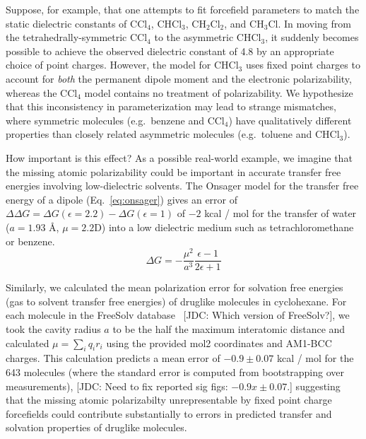 \documentclass[aps,pre,twocolumn,nofootinbib,superscriptaddress,linenumbers]{revtex4-1}
\begin{document}
Suppose, for example, that one attempts to fit forcefield parameters to match the static dielectric constants of $\mathrm{CCl_4}$, $\mathrm{CHCl_3}$, $\mathrm{CH_2Cl_2}$, and $\mathrm{CH_3Cl}$.
In moving from the tetrahedrally-symmetric $\mathrm{CCl_4}$ to the asymmetric $\mathrm{CHCl_3}$, it suddenly becomes possible to achieve the observed dielectric constant of 4.8 by an appropriate choice of point charges.
However, the model for $\mathrm{CHCl_3}$ uses fixed point charges to account for \emph{both} the permanent dipole moment and the electronic polarizability, whereas the $\mathrm{CCl_4}$ model contains no treatment of polarizability.  
We hypothesize that this inconsistency in parameterization may lead to strange mismatches, where symmetric molecules (e.g.~benzene and $\mathrm{CCl_4}$) have qualitatively different properties than closely related asymmetric molecules (e.g.~toluene and $\mathrm{CHCl_3}$).

How important is this effect?
As a possible real-world example, we imagine that the missing atomic polarizability could be important in accurate transfer free energies involving low-dielectric solvents.  
The Onsager model for the transfer free energy of a dipole (Eq.~\ref{eq:onsager}) gives an error of $\Delta \Delta G = \Delta G(\epsilon=2.2) - \Delta G(\epsilon=1)$ of $-2$ kcal / mol for the transfer of water ($a = 1.93$ \AA, $\mu = 2.2$D) into a low dielectric medium such as tetrachloromethane or benzene.  
\begin{equation} \label{eq:onsager}
\Delta G = -\frac{\mu^2}{a^3}\frac{\epsilon - 1}{2 \epsilon + 1}
\end{equation}

Similarly, we calculated the mean polarization error for solvation free energies (gas to solvent transfer free energies) of druglike molecules in cyclohexane.  
For each molecule in the FreeSolv database~\cite{freesolv} {\color{red}[JDC: Which version of FreeSolv?]}, we took the cavity radius $a$ to be the half the maximum interatomic distance and calculated $\mu = \sum_i q_i r_i$ using the provided mol2 coordinates and AM1-BCC charges.  
This calculation predicts a mean error of $-0.9\pm0.07$ kcal / mol for the 643 molecules (where the standard error is computed from bootstrapping over measurements), 
{\color{red}[JDC: Need to fix reported sig figs: $-0.9x\pm0.07$.]}
suggesting that the missing atomic polarizabilty unrepresentable by fixed point charge forcefields could contribute substantially to errors in predicted transfer and solvation properties of druglike molecules.  
\end{document}

